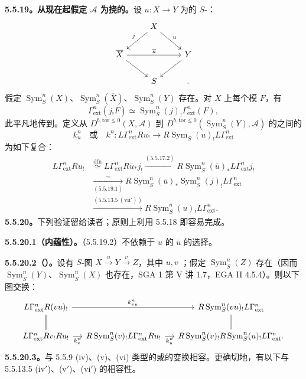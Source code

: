 \textbf{5.5.19。从现在起假定 $\mathscr A$ 为挠的。}设 $u:X\to Y$ 为的 $S$-：
\[\begin{tikzcd}
&X\arrow[dl,"j"']\arrow[dr,"u"]&\\
\overline X\arrow[rr,"\overline u"]\arrow[dr]&&Y\arrow[dl]\\&S&.
\end{tikzcd}\]
假定 $\operatorname{Sym}^n_S(X)$、$\operatorname{Sym}^n_S(\overline X)$、$\operatorname{Sym}^n_S(Y)$ 存在。对 $X$ 上每个模 $F$，有
\begin{equation}\tag{5.5.19.1}\Gamma^n_{\mathrm{ext}}(j_!F)\simeq\operatorname{Sym}^n_S(j)_!\Gamma^n_{\mathrm{ext}}(F),\end{equation}
此平凡地传到。定义从 $D^{b,\mathrm{tor}\leq0}(X,\mathscr A)$ 到 $D^{b,\mathrm{tor}\leq0}(\operatorname{Sym}^n_S(Y),\mathscr A)$ 的之间的
\begin{equation}\tag{5.5.19.2}k^n_u\quad\text{或}\quad k^n:L\Gamma^n_{\mathrm{ext}}Ru_!\longrightarrow R\operatorname{Sym}_S(u)_!L\Gamma^n_{\mathrm{ext}}\end{equation}
为如下复合：
\[\begin{aligned}
L\Gamma^n_{\mathrm{ext}}Ru_!&\overset{\mathrm{dfn}}\simeq L\Gamma^n_{\mathrm{ext}}R\overline u_*j_!\xrightarrow{(5.5.17.2)}R\operatorname{Sym}^n_S(\overline u)_*L\Gamma^n_{\mathrm{ext}}j_!\\
&\xrightarrow[(5.5.19.1)]{\sim}R\operatorname{Sym}^n_S(\overline u)_*\operatorname{Sym}^n_S(j)_!L\Gamma^n_{\mathrm{ext}}\\
&\xrightarrow{(5.5.13.5\ (\mathrm{vii}'))}R\operatorname{Sym}^n_S(u)_!L\Gamma^n_{\mathrm{ext}}.
\end{aligned}\]
\textbf{5.5.20。}下列验证留给读者；原则上利用 5.5.18 即容易完成。

\textbf{5.5.20.1（内蕴性）。}（5.5.19.2）不依赖于 $u$ 的 $\overline u$ 的选择。

\textbf{5.5.20.2（）。}设有 $S$-图 $X\xrightarrow uY\xrightarrow vZ$，其中 $u,v$ ；假定 $\operatorname{Sym}^n_S(Z)$ 存在（因而 $\operatorname{Sym}^n_S(Y)$、$\operatorname{Sym}^n_S(X)$ 也存在，SGA 1 第 V 讲 1.7，EGA II 4.5.4）。则以下图交换：
\[\begin{tikzcd}[column sep=small]
L\Gamma^n_{\mathrm{ext}}R(vu)_!\arrow[rr,"k^n_{vu}"]\arrow[d,equal]&&R\operatorname{Sym}^n_S(vu)_!L\Gamma^n_{\mathrm{ext}}\arrow[d,equal]\\
L\Gamma^n_{\mathrm{ext}}Rv_!Ru_!\arrow[r,"k^n_v"']&R\operatorname{Sym}^n_S(v)_!L\Gamma^n_{\mathrm{ext}}Ru_!\arrow[r,"k^n_u"']&R\operatorname{Sym}^n_S(v)_!R\operatorname{Sym}^n_S(u)_!L\Gamma^n_{\mathrm{ext}}.
\end{tikzcd}\]
\textbf{5.5.20.3。}与 5.5.9 (iv)、(v)、(vi) 类型的或的变换相容。更确切地，有以下与 5.5.13.5 (iv$'$)、(v$'$)、(vi$'$) 的相容性。

